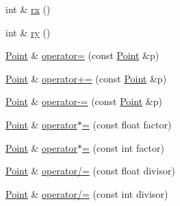 \begin{DoxyCompactItemize}
\item 
int \& \hyperlink{classprism_1_1_point_abcbcac675e56f63e69d7fc165fd66106}{rx} ()
\item 
int \& \hyperlink{classprism_1_1_point_a380a0a615af10ec2392a472ca11325d7}{ry} ()
\item 
\hyperlink{classprism_1_1_point}{Point} \& \hyperlink{classprism_1_1_point_a7e3386be01e28ac9db673c91384a0d53}{operator=} (const \hyperlink{classprism_1_1_point}{Point} \&p)
\item 
\hyperlink{classprism_1_1_point}{Point} \& \hyperlink{classprism_1_1_point_a3df2e80f1554f772e14d1b4ecc55e4a9}{operator+=} (const \hyperlink{classprism_1_1_point}{Point} \&p)
\item 
\hyperlink{classprism_1_1_point}{Point} \& \hyperlink{classprism_1_1_point_a6d407a4ac17b13e941b31519d5f7a8a3}{operator-\/=} (const \hyperlink{classprism_1_1_point}{Point} \&p)
\item 
\hyperlink{classprism_1_1_point}{Point} \& \hyperlink{classprism_1_1_point_a170f9053e8e7c3319c86de5af5843ee4}{operator$\ast$=} (const float factor)
\item 
\hyperlink{classprism_1_1_point}{Point} \& \hyperlink{classprism_1_1_point_ab036f1dc222dd33a580df59a4170f60f}{operator$\ast$=} (const int factor)
\item 
\hyperlink{classprism_1_1_point}{Point} \& \hyperlink{classprism_1_1_point_a6b5e3e019f8cf484d372fc355e6c7a64}{operator/=} (const float divisor)
\item 
\hyperlink{classprism_1_1_point}{Point} \& \hyperlink{classprism_1_1_point_a6d152f61b02e2a62b356627079c15089}{operator/=} (const int divisor)
\end{DoxyCompactItemize}
